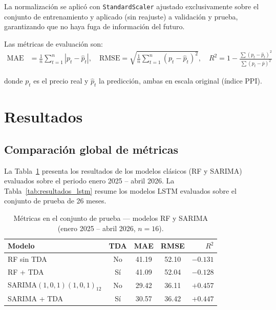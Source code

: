 \documentclass[12pt, a4paper]{article}
\newcommand{\mae}{\mathrm{MAE}}
\newcommand{\rmse}{\mathrm{RMSE}}
\begin{document}
La normalización se aplicó con \texttt{StandardScaler} ajustado exclusivamente sobre el conjunto
de entrenamiento y aplicado (sin reajuste) a validación y prueba, garantizando que no haya
fuga de información del futuro.

Las métricas de evaluación son:
\begin{align}
  \mae  &= \frac{1}{n}\sum_{t=1}^{n} |p_t - \hat{p}_t|, \quad
  \rmse  = \sqrt{\frac{1}{n}\sum_{t=1}^{n}(p_t - \hat{p}_t)^2}, \quad
  R^2   = 1 - \frac{\sum(p_t - \hat{p}_t)^2}{\sum(p_t - \bar{p})^2}
\end{align}

donde $p_t$ es el precio real y $\hat{p}_t$ la predicción, ambas en escala original (índice PPI).

\section{Resultados}

\subsection{Comparación global de métricas}

La Tabla~\ref{tab:resultados_sarima_rf} presenta los resultados de los modelos clásicos (RF y
SARIMA) evaluados sobre el periodo enero 2025 – abril 2026. La Tabla~\ref{tab:resultados_lstm}
resume los modelos LSTM evaluados sobre el conjunto de prueba de 26 meses.

\begin{table}[H]
  \centering
  \caption{Métricas en el conjunto de prueba — modelos RF y SARIMA
           (enero 2025 – abril 2026, $n=16$).}
  \label{tab:resultados_sarima_rf}
  \begin{tabular}{lcccr}
    \toprule
    \textbf{Modelo} & \textbf{TDA} & \textbf{MAE} & \textbf{RMSE} & \textbf{$R^2$} \\
    \midrule
    RF sin TDA                      & No  & 41.19 & 52.10 & $-0.131$ \\
    RF + TDA                        & Sí  & 41.09 & 52.04 & $-0.128$ \\
    SARIMA$(1,0,1)(1,0,1)_{12}$     & No  & 29.42 & 36.11 & $+0.457$ \\
    SARIMA + TDA                    & Sí  & 30.57 & 36.42 & $+0.447$ \\
    \bottomrule
  \end{tabular}
\end{table}
\end{document}
